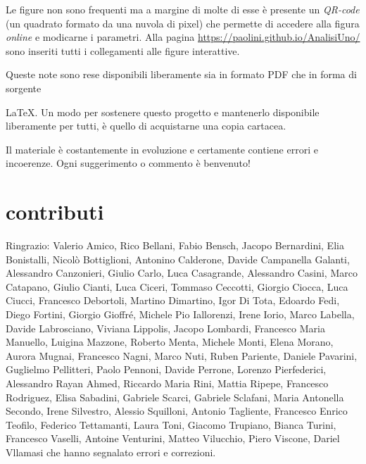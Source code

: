 Le figure non sono frequenti ma a margine di molte di esse  %
è presente un \emph{QR-code} (un quadrato formato da una nuvola di pixel) %
che permette di accedere alla figura  %
\emph{online} e modicarne i parametri.  %
Alla pagina \url{https://paolini.github.io/AnalisiUno/} 
sono inseriti tutti i collegamenti alle figure interattive.
\begin{comment}
Di seguito in questa pagina trovate l'elenco %
con i collegamenti alle figure interattive. %
\end{comment}
Queste note sono rese disponibili liberamente sia in formato PDF che %
in forma di sorgente %
\begin{comment}
LaTeX. %
\end{comment}
\LaTeX{}.
Un modo per sostenere questo progetto e mantenerlo disponibile liberamente 
per tutti, è quello di acquistarne una copia cartacea.

Il materiale è costantemente in evoluzione %
e certamente contiene errori e incoerenze. Ogni suggerimento o commento è %
benvenuto! %


\section*{contributi}

Ringrazio:
%
Valerio Amico,
Rico Bellani,
Fabio Bensch,
Jacopo Bernardini,
Elia Bonistalli,
Nicolò Bottiglioni,
Antonino Calderone,
Davide Campanella Galanti,
Alessandro Canzonieri,
Giulio Carlo,
Luca Casagrande,
Alessandro Casini,
Marco Catapano,
Giulio Cianti,
Luca Ciceri,
Tommaso Ceccotti,
Giorgio Ciocca,
Luca Ciucci,
Francesco Debortoli,
Martino Dimartino,
Igor Di Tota,
Edoardo Fedi,
Diego Fortini,
Giorgio Gioffré,
Michele Pio Iallorenzi,
Irene Iorio,
Marco Labella,
Davide Labrosciano,
Viviana Lippolis,
Jacopo Lombardi,
Francesco Maria Manuello,
Luigina Mazzone,
Roberto Menta,
Michele Monti,
Elena Morano,
Aurora Mugnai,
Francesco Nagni,
Marco Nuti,
Ruben Pariente,
Daniele Pavarini,
Guglielmo Pellitteri,
Paolo Pennoni,
Davide Perrone,
Lorenzo Pierfederici,
Alessandro Rayan Ahmed,
Riccardo Maria Rini,
Mattia Ripepe,
Francesco Rodriguez,
Elisa Sabadini,
Gabriele Scarci,
Gabriele Sclafani,
Maria Antonella Secondo,
Irene Silvestro,
Alessio Squilloni,
Antonio Tagliente,
Francesco Enrico Teofilo,
Federico Tettamanti,
Laura Toni,
Giacomo Trupiano,
Bianca Turini,
Francesco Vaselli,
Antoine Venturini,
Matteo Vilucchio,
Piero Viscone,
Dariel Vllamasi
%
che hanno segnalato errori e correzioni.

